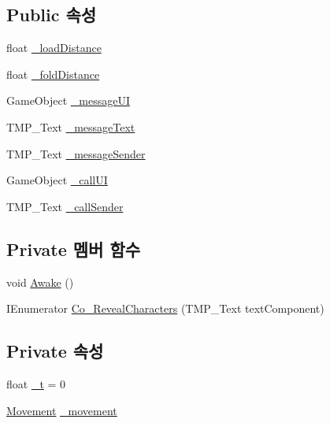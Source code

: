 \subsection*{Public 속성}
\begin{DoxyCompactItemize}
\item 
float \mbox{\hyperlink{class_phone_controller_ad9d36449378663ab0cd0eff387064549}{\+\_\+load\+Distance}}
\item 
float \mbox{\hyperlink{class_phone_controller_ab5c361d8cd617d9f2c8042895e78f994}{\+\_\+fold\+Distance}}
\item 
Game\+Object \mbox{\hyperlink{class_phone_controller_a8811f718e73a667a613b36eb5c9adeb4}{\+\_\+message\+UI}}
\item 
T\+M\+P\+\_\+\+Text \mbox{\hyperlink{class_phone_controller_a0ed3e219aab6580a863eecf02d7b1445}{\+\_\+message\+Text}}
\item 
T\+M\+P\+\_\+\+Text \mbox{\hyperlink{class_phone_controller_a23a70ce5943f407c7127900c4adf8948}{\+\_\+message\+Sender}}
\item 
Game\+Object \mbox{\hyperlink{class_phone_controller_a9d65dc970e4d83bc27fd134876cdb89e}{\+\_\+call\+UI}}
\item 
T\+M\+P\+\_\+\+Text \mbox{\hyperlink{class_phone_controller_a6b16e54feee37a4f2b10e80aeb987cfb}{\+\_\+call\+Sender}}
\end{DoxyCompactItemize}
\subsection*{Private 멤버 함수}
\begin{DoxyCompactItemize}
\item 
void \mbox{\hyperlink{class_phone_controller_afbe67357f6ee7c8cd0d7cb7465cc8673}{Awake}} ()
\item 
I\+Enumerator \mbox{\hyperlink{class_phone_controller_a70b2b14d4c9dd2b09f1a91a6229d5ade}{Co\+\_\+\+Reveal\+Characters}} (T\+M\+P\+\_\+\+Text text\+Component)
\end{DoxyCompactItemize}
\subsection*{Private 속성}
\begin{DoxyCompactItemize}
\item 
float \mbox{\hyperlink{class_phone_controller_ac77b92e249c4d33f97abb1d98fab21b3}{\+\_\+t}} = 0
\item 
\mbox{\hyperlink{class_movement}{Movement}} \mbox{\hyperlink{class_phone_controller_a84eaea2042a921af0db16b3f1ea5229c}{\+\_\+movement}}
\end{DoxyCompactItemize}



